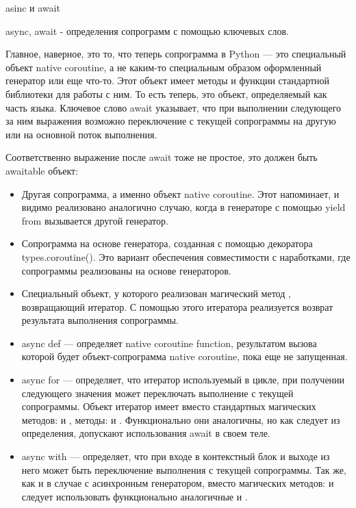 asinc и await

		async, await - определения сопрограмм с помощью ключевых слов.
	
	Главное, наверное, это то, что теперь сопрограмма в Python — это специальный объект native coroutine, а не каким-то специальным образом оформленный генератор или еще что-то. Этот объект имеет методы и функции стандартной библиотеки для работы с ним. То есть теперь, это объект, определяемый как часть языка. 
	Ключевое слово await указывает, что при выполнении следующего за ним выражения возможно переключение с текущей сопрограммы на другую или на основной поток выполнения.
	
	Соответственно выражение после await тоже не простое, это должен быть awaitable объект:

		\begin{itemize}
		\item Другая сопрограмма, а именно объект native coroutine. Этот напоминает, и видимо реализовано аналогично случаю, когда в генераторе с помощью yield from вызывается другой генератор.
		\item Сопрограмма на основе генератора, созданная с помощью декоратора types.coroutine(). Это вариант обеспечения совместимости с наработками, где сопрограммы реализованы на основе генераторов.
		\item Специальный объект, у которого реализован магический метод , возвращающий итератор. С помощью этого итератора реализуется возврат результата выполнения сопрограммы.
	\end{itemize}
	
	\begin{itemize}
		\item async def — определяет native coroutine function, результатом вызова которой будет объект-сопрограмма native coroutine, пока еще не запущенная.
		\item async for — определяет, что итератор используемый в цикле, при получении следующего значения может переключать выполнение с текущей сопрограммы. Объект итератор имеет вместо стандартных магических методов:  и , методы:  и . Функционально они аналогичны, но как следует из определения, допускают использования await в своем теле.
		\item async with — определяет, что при входе в контекстный блок и выходе из него может быть переключение выполнения с текущей сопрограммы. Так же, как и в случае с асинхронным генератором, вместо магических методов:  и  следует использовать функционально аналогичные  и .
	\end{itemize}
	
